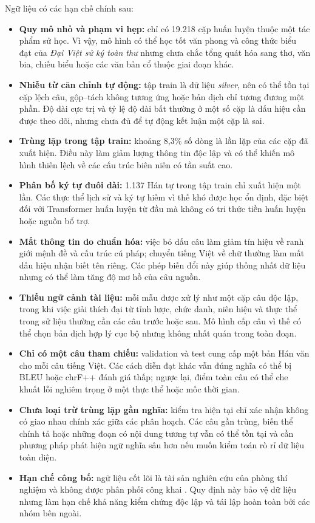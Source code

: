 Ngữ liệu có các hạn chế chính sau:

\begin{itemize}
    \item \textbf{Quy mô nhỏ và phạm vi hẹp:} chỉ có 19.218 cặp huấn luyện thuộc một tác phẩm sử học. Vì vậy, mô hình có thể học tốt văn phong và công thức biểu đạt của \textit{Đại Việt sử ký toàn thư} nhưng chưa chắc tổng quát hóa sang thơ, văn bia, chiếu biểu hoặc các văn bản cổ thuộc giai đoạn khác.
    \item \textbf{Nhiễu từ căn chỉnh tự động:} tập train là dữ liệu \textit{silver}, nên có thể tồn tại cặp lệch câu, gộp--tách không tương ứng hoặc bản dịch chỉ tương đương một phần. Độ dài cực trị và tỷ lệ độ dài bất thường ở một số cặp là dấu hiệu cần được theo dõi, nhưng chưa đủ để tự động kết luận một cặp là sai.
    \item \textbf{Trùng lặp trong tập train:} khoảng 8,3\% số dòng là lần lặp của các cặp đã xuất hiện. Điều này làm giảm lượng thông tin độc lập và có thể khiến mô hình thiên lệch về các cấu trúc biên niên có tần suất cao.
    \item \textbf{Phân bố ký tự đuôi dài:} 1.137 Hán tự trong tập train chỉ xuất hiện một lần. Các thực thể lịch sử và ký tự hiếm vì thế khó được học ổn định, đặc biệt đối với Transformer huấn luyện từ đầu mà không có tri thức tiền huấn luyện hoặc nguồn bổ trợ.
    \item \textbf{Mất thông tin do chuẩn hóa:} việc bỏ dấu câu làm giảm tín hiệu về ranh giới mệnh đề và cấu trúc cú pháp; chuyển tiếng Việt về chữ thường làm mất dấu hiệu nhận biết tên riêng. Các phép biến đổi này giúp thống nhất dữ liệu nhưng có thể làm tăng độ mơ hồ của câu nguồn.
    \item \textbf{Thiếu ngữ cảnh tài liệu:} mỗi mẫu được xử lý như một cặp câu độc lập, trong khi việc giải thích đại từ tỉnh lược, chức danh, niên hiệu và thực thể trong sử liệu thường cần các câu trước hoặc sau. Mô hình cấp câu vì thế có thể chọn bản dịch hợp lý cục bộ nhưng không nhất quán trong toàn đoạn.
    \item \textbf{Chỉ có một câu tham chiếu:} validation và test cung cấp một bản Hán văn cho mỗi câu tiếng Việt. Các cách diễn đạt khác vẫn đúng nghĩa có thể bị BLEU hoặc chrF++ đánh giá thấp; ngược lại, điểm toàn câu có thể che khuất lỗi nghiêm trọng ở một thực thể hoặc mốc thời gian.
    \item \textbf{Chưa loại trừ trùng lặp gần nghĩa:} kiểm tra hiện tại chỉ xác nhận không có giao nhau chính xác giữa các phân hoạch. Các câu gần trùng, biến thể chính tả hoặc những đoạn có nội dung tương tự vẫn có thể tồn tại và cần phương pháp phát hiện ngữ nghĩa sâu hơn nếu muốn kiểm toán rò rỉ dữ liệu toàn diện.
    \item \textbf{Hạn chế công bố:} ngữ liệu cốt lõi là tài sản nghiên cứu của phòng thí nghiệm và không được phân phối công khai \cite{projectspec2026}. Quy định này bảo vệ dữ liệu nhưng làm hạn chế khả năng kiểm chứng độc lập và tái lập hoàn toàn bởi các nhóm bên ngoài.
\end{itemize}
